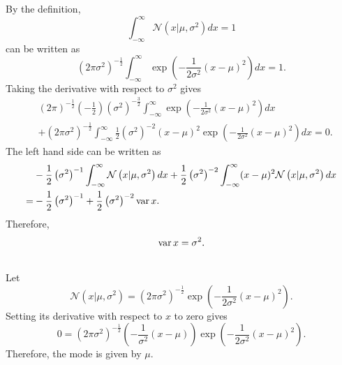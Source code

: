 By the definition,  
%
\begin{equation}
\int_{- \infty}^{\infty} 
\mathcal{N} 
\left( 
	x 
	| 
	\mu, 
	\sigma ^ 2 
\right) 
dx 
= 
1
\end{equation}
%
can be written as
%
\begin{equation}
\left( 
	2 \pi \sigma ^ 2 
\right) ^ {-\frac{1}{2}} 
\int_{-\infty}^{\infty} 
\exp 
\left( 
	- 
	\frac{1}{2 \sigma ^ 2} 
	(x - \mu) ^ 2 
\right) 
dx 
= 
1.
\end{equation}
%
Taking the derivative with respect to $\sigma ^ 2$ gives 
%
\begin{equation}
\begin{aligned}
&
\left( 
	2 \pi 
\right) ^ {-\frac{1}{2}} 
\left( 
	- 
	\frac{1}{2} 
\right) 
\left( 
	\sigma ^ 2 
\right) ^ {- \frac{3}{2}} 
\int_{-\infty}^{\infty} 
\exp 
\left( 
	-
	\frac{1}{2 \sigma ^ 2} 
	(x - \mu) ^ 2 
\right) dx 
\\
&+ 
\left( 
	2 \pi \sigma ^ 2 
\right) ^ {-\frac{1}{2}} 
\int_{-\infty}^{\infty} 
\frac{1}{2} 
\left( 
	\sigma ^ 2 
\right) ^ {- 2} 
(x - \mu) ^ 2 
\exp 
\left( 
	- 
	\frac{1}{2 \sigma ^ 2} 
	(x - \mu) ^ 2 
\right) 
dx 
= 
0.
\end{aligned}
\end{equation}
%
The left hand side can be written as
%
\begin{equation}
\begin{aligned}
&
- 
\frac{1}{2} 
\left( 
	\sigma ^ 2 
\right) ^ {- 1} 
\int_{- \infty}^{\infty} 
\mathcal{N} 
\left( 
	x 
	| 
	\mu, 
	\sigma ^ 2 
\right) 
dx 
+ 
\frac{1}{2} 
\left( 
	\sigma ^ 2 
\right) ^ {- 2} 
\int_{- \infty} ^ {\infty} 
(x - \mu) ^ 2 
\mathcal{N} 
\left( 
	x 
	| 
	\mu, 
	\sigma ^ 2 
\right) dx 
\\
=& 
- 
\frac{1}{2} 
\left( 
	\sigma ^ 2 
\right) ^ {- 1} 
+ 
\frac{1}{2} 
\left( 
	\sigma ^ 2 
\right) ^ {- 2} 
\operatorname{var} x.
\end{aligned}
\end{equation}
%
Therefore,
%
\begin{equation}
\operatorname{var} x 
= 
\sigma ^ 2.
\end{equation}
%


\subsection{}
\label{1.9}
Let
%
\begin{equation}
\mathcal{N} 
\left( 
	x 
	| 
	\mu, 
	\sigma ^ 2 
\right) 
= 
\left( 
	2 \pi \sigma ^ 2 
\right) ^ {- \frac{1}{2}} 
\exp 
\left( 
	- 
	\frac{1}{2 \sigma ^ 2} 
	(x - \mu) ^ 2 
\right).
\end{equation}
%
Setting its derivative with respect to $x$ to zero gives
%
\begin{equation}
0 
= 
\left( 
	2 \pi \sigma ^ 2 
\right) ^ {- \frac{1}{2}} 
\left( 
	- 
	\frac{1}{\sigma ^ 2} 
	(x - \mu) 
\right) 
\exp 
\left( 
	- 
	\frac{1}{2 \sigma ^ 2} 
	(x - \mu) ^ 2 
\right).
\end{equation}
%
Therefore, the mode is given by $\mu$.

